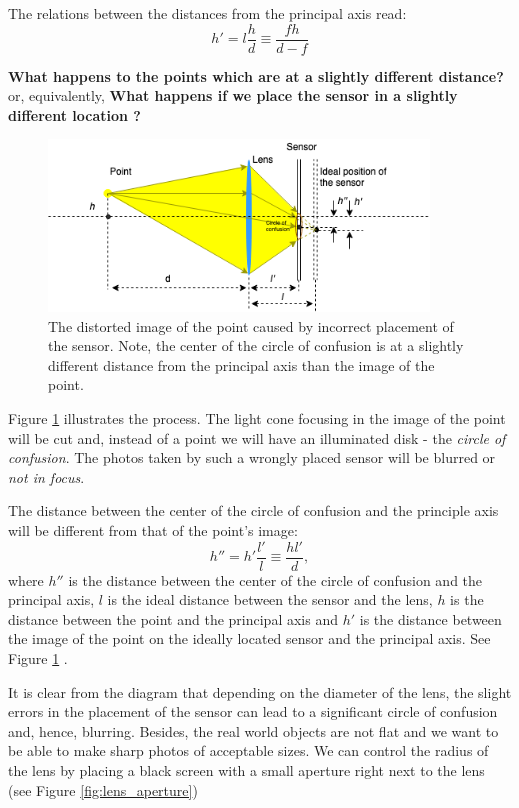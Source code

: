 \documentclass[a4paper,10pt]{article}
\begin{document}
The relations between the distances from the principal axis read:
\begin{equation}
h' = l\frac{h}{d}\equiv \frac{fh}{d-f}
\end{equation} 


{\bf What happens to the points which are at a slightly different distance?} or, equivalently,  {\bf What happens if we place the sensor in a slightly different location ?}

\begin{figure}[h]
\centering
 \includegraphics[width=0.9\textwidth]{../../images/lens_confusion_circle.png}
 \caption{The distorted image of the point caused by incorrect placement of the sensor. Note, the center of the circle of confusion is at a slightly different distance from the principal axis than the image of the point.}
 \label{fig:lens_cconf}
\end{figure}

Figure \ref{fig:lens_cconf} illustrates the process. The light cone focusing in the image of the point will be cut and, instead of a point we will have an illuminated disk - the {\it circle of confusion}. The photos taken by such a wrongly placed sensor will be blurred or {\it not in focus}. 

The distance between the center of the circle of confusion and the principle axis will be different from that of the point's image:
\begin{equation}
h'' = h'\frac{l'}{l} \equiv \frac{hl'}{d},
\label{dcirc}
\end{equation} 
where $h''$ is the distance between the center of the circle of confusion and the principal axis, $l$ is the ideal distance between the sensor and the lens, $h$ is the distance between the point and the principal axis and $h'$ is the distance between the image of the point on the ideally located sensor and the principal axis. See Figure \ref{fig:lens_cconf} .


It is clear from the diagram that depending on the diameter of the lens, the slight errors in the placement of the sensor can lead to a significant circle of confusion and, hence, blurring. Besides, the real world objects are not flat and we want to be able to make sharp photos of acceptable  sizes. We can control  the radius of the lens by placing a black screen with a small aperture right next to the lens (see Figure \ref{fig:lens_aperture}) 
\end{document}
